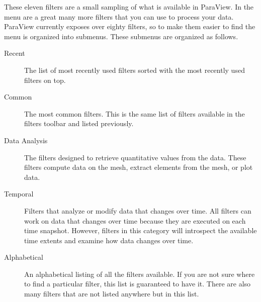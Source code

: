 
These eleven filters are a small sampling of what is available in ParaView.
In the  menu are a great many more filters that you can use to
process your data.  ParaView currently exposes over eighty filters, so to
make them easier to find the  menu is organized into submenus.
These submenus are organized as follows.

\begin{description}
\item[Recent] The list of most recently used filters sorted with the most
  recently used filters on top.
\item[Common] The most common filters.  This is the same list of filters
  available in the filters toolbar and listed previously.
\item[Data Analysis] The filters designed to retrieve quantitative values
  from the data.  These filters compute data on the mesh, extract elements
  from the mesh, or plot data.
\item[Temporal] Filters that analyze or modify data that changes over time.
  All filters can work on data that changes over time because they are
  executed on each time snapshot.  However, filters in this category will
  introspect the available time extents and examine how data changes over
  time.
\item[Alphabetical] An alphabetical listing of all the filters available.
  If you are not sure where to find a particular filter, this list is
  guaranteed to have it.  There are also many filters that are not listed
  anywhere but in this list.
\end{description}


